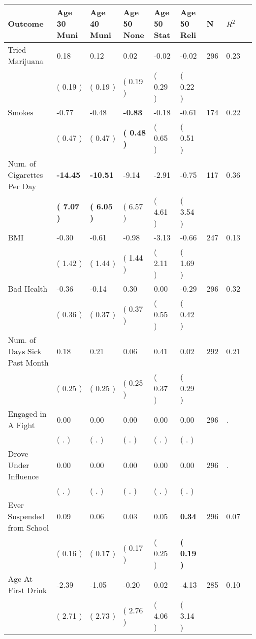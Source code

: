 \begin{tabular}{L{6.2cm} C{1.8cm} C{1.8cm} C{1.8cm} C{1.8cm} C{1.8cm} C{1.8cm} C{0.3cm} C{0.3cm}}
\toprule
 \textbf{Outcome} & \textbf{Age 30 Muni} & \textbf{Age 40 Muni} & \textbf{Age 50 None} & \textbf{Age 50 Stat} & \textbf{Age 50 Reli} & \textbf{N} & \textbf{$ R^2$} \\
\midrule
Tried Marijuana &      0.18 &      0.12 &      0.02 &     -0.02 &     -0.02  & 296 &       0.23 \\ 
 & (     0.19 ) & (     0.19 ) & (     0.19 ) & (     0.29 ) & (     0.22 )  & \\
Smokes &     -0.77 &     -0.48 & \textbf{    -0.83} &     -0.18 &     -0.61  & 174 &       0.22 \\ 
 & (     0.47 ) & (     0.47 ) & \textbf{(     0.48 )} & (     0.65 ) & (     0.51 )  & \\
Num. of Cigarettes Per Day & \textbf{   -14.45} & \textbf{   -10.51} &     -9.14 &     -2.91 &     -0.75  & 117 &       0.36 \\ 
 & \textbf{(     7.07 )} & \textbf{(     6.05 )} & (     6.57 ) & (     4.61 ) & (     3.54 )  & \\
BMI &     -0.30 &     -0.61 &     -0.98 &     -3.13 &     -0.66  & 247 &       0.13 \\ 
 & (     1.42 ) & (     1.44 ) & (     1.44 ) & (     2.11 ) & (     1.69 )  & \\
Bad Health &     -0.36 &     -0.14 &      0.30 &      0.00 &     -0.29  & 296 &       0.32 \\ 
 & (     0.36 ) & (     0.37 ) & (     0.37 ) & (     0.55 ) & (     0.42 )  & \\
Num. of Days Sick Past Month &      0.18 &      0.21 &      0.06 &      0.41 &      0.02  & 292 &       0.21 \\ 
 & (     0.25 ) & (     0.25 ) & (     0.25 ) & (     0.37 ) & (     0.29 )  & \\
Engaged in A Fight &      0.00 &      0.00 &      0.00 &      0.00 &      0.00  & 296 &          . \\ 
 & (        . ) & (        . ) & (        . ) & (        . ) & (        . )  & \\
Drove Under Influence &      0.00 &      0.00 &      0.00 &      0.00 &      0.00  & 296 &          . \\ 
 & (        . ) & (        . ) & (        . ) & (        . ) & (        . )  & \\
Ever Suspended from School &      0.09 &      0.06 &      0.03 &      0.05 & \textbf{     0.34}  & 296 &       0.07 \\ 
 & (     0.16 ) & (     0.17 ) & (     0.17 ) & (     0.25 ) & \textbf{(     0.19 )}  & \\
Age At First Drink &     -2.39 &     -1.05 &     -0.20 &      0.02 &     -4.13  & 285 &       0.10 \\ 
 & (     2.71 ) & (     2.73 ) & (     2.76 ) & (     4.06 ) & (     3.14 )  & \\
\bottomrule
\end{tabular}

